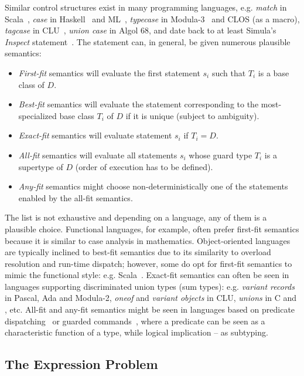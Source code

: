 Similar control structures exist in many programming languages, e.g. 
\emph{match} in Scala~\cite{Scala2nd}, \emph{case} in Haskell~\cite{Haskell98Book} and 
ML~\cite{ML90}, \emph{typecase} in Modula-3~\cite{Modula3TS} and CLOS (as a 
macro), \emph{tagcase} in CLU~\cite{CLURefMan}, \emph{union case} in Algol 68, 
and date back to at least Simula's \emph{Inspect} statement~\cite{Simula67}. 
The statement can, in general, be given numerous plausible semantics:
%
\begin{itemize}
\setlength{\itemsep}{0pt}
\setlength{\parskip}{0pt}
\item \emph{First-fit} semantics will evaluate the first statement $s_i$ such 
      that $T_i$ is a base class of $D$.
\item \emph{Best-fit} semantics will evaluate the statement corresponding to the 
      most-specialized base class $T_i$ of $D$ if it is unique (subject to 
      ambiguity).
\item \emph{Exact-fit} semantics will evaluate statement $s_i$ if $T_i=D$.
\item \emph{All-fit} semantics will evaluate all statements $s_i$ whose guard 
      type $T_i$ is a supertype of $D$ (order of execution has to be defined).
\item \emph{Any-fit} semantics might choose non-deterministically one of the 
      statements enabled by the all-fit semantics.
\end{itemize}
%
The list is not exhaustive and depending on a language, any of them
is a plausible choice. Functional languages, for example, often prefer 
first-fit semantics because it is similar to case analysis in mathematics. 
Object-oriented languages are typically inclined to best-fit semantics due 
to its similarity to overload resolution and run-time dispatch; however, some 
do opt for first-fit semantics to mimic the functional style: e.g. Scala~\cite{Scala2nd}. 
Exact-fit semantics can often be seen in languages supporting discriminated 
union types (sum types): e.g. \emph{variant records} in Pascal, Ada and Modula-2, 
\emph{oneof} and \emph{variant objects} in CLU, \emph{unions} in C and \Cpp{}, etc. 
All-fit and any-fit semantics might be seen in languages based on predicate 
dispatching~\cite{ErnstKC98} or guarded commands~\cite{EWD:EWD472}, where a 
predicate can be seen as a characteristic function of a type, while logical 
implication -- as subtyping.

\subsection{The Expression Problem}

